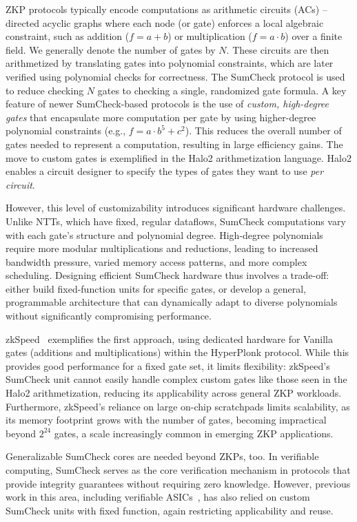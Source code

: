 ZKP protocols typically encode computations as arithmetic circuits (ACs) -- directed acyclic graphs where each node (or gate) enforces a local algebraic constraint, such as addition ($f = a+b$) or multiplication ($f = a\cdot b$) over a finite field. We generally denote the number of gates by $N$. These circuits are then arithmetized by translating gates into polynomial constraints, which are later verified using polynomial checks for correctness. The SumCheck protocol is used to reduce checking $N$ gates to checking a single, randomized gate formula.
A key feature of newer SumCheck-based protocols is the use of \textit{custom, high-degree gates} that encapsulate more computation per gate by using higher-degree polynomial constraints (e.g., $f = a\cdot b^5 + c^2$).
This reduces the overall number of gates needed to represent a computation, resulting in large efficiency gains. The move to custom gates is exemplified in the Halo2 arithmetization language\cite{halo2}. Halo2 enables a circuit designer to specify the types of gates they want to use \emph{per circuit}. 

However, this level of customizability introduces significant hardware challenges. Unlike NTTs, which have fixed, regular dataflows, SumCheck computations vary with each gate’s structure and polynomial degree. High-degree polynomials require more modular multiplications and reductions, leading to increased bandwidth pressure, varied memory access patterns, and more complex scheduling. Designing efficient SumCheck hardware thus involves a trade-off: either build fixed-function units for specific gates, or develop a general, programmable architecture that can dynamically adapt to diverse polynomials without significantly compromising performance. 

zkSpeed~\cite{zkspeed2025} exemplifies the first approach, using dedicated hardware for Vanilla gates (additions and multiplications) within the HyperPlonk protocol. While this provides good performance for a fixed gate set, it limits flexibility: zkSpeed’s SumCheck unit cannot easily handle complex custom gates like those seen in the Halo2 arithmetization, reducing its applicability across general ZKP workloads. Furthermore, zkSpeed's reliance on large on-chip scratchpads limits scalability, as its memory footprint grows with the number of gates, becoming impractical beyond $2^{24}$ gates, a scale increasingly common in emerging ZKP applications.

Generalizable SumCheck cores are needed beyond ZKPs, too. In verifiable computing, SumCheck serves as the core verification mechanism in protocols that provide integrity guarantees without requiring zero knowledge. However, previous work in this area, including verifiable ASICs~\cite{verifiable_asics}, has also relied on custom SumCheck units with fixed function, again restricting applicability and reuse.

